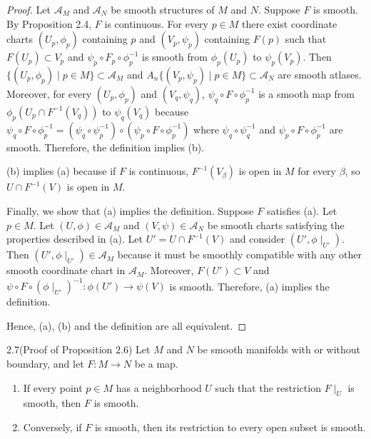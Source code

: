 \begin{proof}
  Let $\mathcal{A}_M$ and $\mathcal{A}_N$ be smooth structures of $M$ and $N$.
  Suppose $F$ is smooth.
  By Proposition 2.4, $F$ is continuous.
  For every $p \in M$ there exist coordinate charts $(U_p, \phi_p)$ containing $p$ and $(V_p, \psi_p)$ containing $F(p)$ such that $F(U_p) \subset V_p$ and $\psi_p \circ F_p \circ \phi_p^{-1}$ is smooth from $\phi_p(U_p)$ to $\psi_p(V_p)$.
  Then $\{ (U_p, \phi_p) \mid p \in M \} \subset \mathcal{A}_M$ and $A_n \{ (V_p, \psi_p) \mid p \in M \} \subset \mathcal{A}_N$ are smooth atlases.
  Moreover, for every $(U_p, \phi_p)$ and $(V_q, \psi_q)$, $\psi_q \circ F \circ \phi_p^{-1}$ is a smooth map from $\phi_p(U_p \cap F^{-1}(V_q))$ to $\psi_q(V_q)$ because $\psi_q \circ F \circ \phi^{-1}_p = (\psi_q \circ \psi_p^{-1}) \circ (\psi_p \circ F \circ \phi_p^{-1})$ where $\psi_q \circ \psi_q^{-1}$ and $\psi_p \circ F \circ \phi_p^{-1}$ are smooth.
  Therefore, the definition implies (b).

  (b) implies (a) because if $F$ is continuous, $F^{-1}(V_{\beta})$ is open in $M$ for every $\beta$, so $U \cap F^{-1}(V)$ is open in $M$.

  Finally, we show that (a) implies the definition.
  Suppose $F$ satisfies (a).
  Let $p \in M$.
  Let $(U, \phi) \in \mathcal{A}_M$ and $(V, \psi) \in \mathcal{A}_N$ be smooth charts satisfying the properties described in (a).
  Let $U' = U \cap F^{-1}(V)$ and consider $(U', \phi\mid_{U'})$.
  Then $(U', \phi\mid_{U'}) \in \mathcal{A}_M$ because it must be smoothly compatible with any other smooth coordinate chart in $\mathcal{A}_M$.
  Moreover, $F(U') \subset V$ and $\psi \circ F \circ (\phi\mid_{U'})^{-1}:\phi(U') \rightarrow \psi(V)$ is smooth.
  Therefore, (a) implies the definition.

  Hence, (a), (b) and the definition are all equivalent.
\end{proof}

\begin{customexer}{2.7(Proof of Proposition 2.6)}
  Let $M$ and $N$ be smooth manifolds with or without boundary, and let $F: M \rightarrow N$ be a map.
  \begin{enumerate}[label=(\alph*)]
    \item 
      If every point $p \in M$ has a neighborhood $U$ such that the restriction $F\mid_U$ is smooth, then $F$ is smooth.
    \item
      Conversely, if $F$ is smooth, then its restriction to every open subset is smooth.
  \end{enumerate}
\end{customexer}

